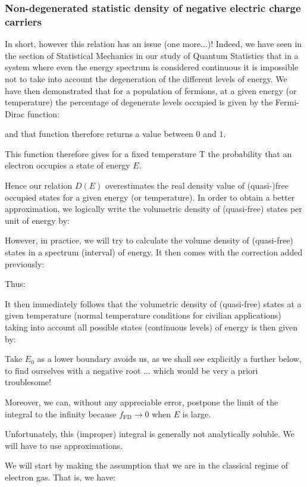 	\subsubsection{Non-degenerated statistic density of negative electric charge carriers}\label{non degenerated statistic density of negative electric charge carriers}
	In short, however this relation has an issue (one more...)! Indeed, we have seen in the section of Statistical Mechanics in our study of Quantum Statistics that in a system where even the energy spectrum is considered continuous it is impossible not to take into account the degeneration of the different levels of energy. We have then demonstrated that for a population of fermions, at a given energy (or temperature) the percentage of degenerate levels occupied is given by the Fermi-Dirac function:
	
	and that function therefore returns a value between $0$ and $1$.

This function therefore gives for a fixed temperature T the probability that an electron occupies a state of energy $E$.

Hence our relation $D(E)$ overestimates the real density value of (quasi-)free occupied states for a given energy (or temperature). In order to obtain a better approximation, we logically write the volumetric density of (quasi-free) states per unit of energy by:
	
	However, in practice, we will try to calculate the volume density of (quasi-free) states in a spectrum (interval) of energy. It then comes with the correction added previously:
	
	Thus:
	
	It then immediately follows that the volumetric density of (quasi-free) states at a given temperature (normal temperature conditions for civilian applications) taking into account all possible states (continuous levels) of energy is then given by:
	
	Take $E_0$ as a lower boundary avoids us, as we shall see explicitly a further below, to find ourselves with a negative root ... which would be very a priori troublesome!

	Moreover, we can, without any appreciable error, postpone the limit of the integral to the infinity because $f_{\text{FD}}\rightarrow 0$ when $E$ is large.

	Unfortunately, this (improper) integral is generally not analytically soluble. We will have to use approximations.

	We will start by making the assumption that we are in the classical regime of electron gas. That is, we have:
	
